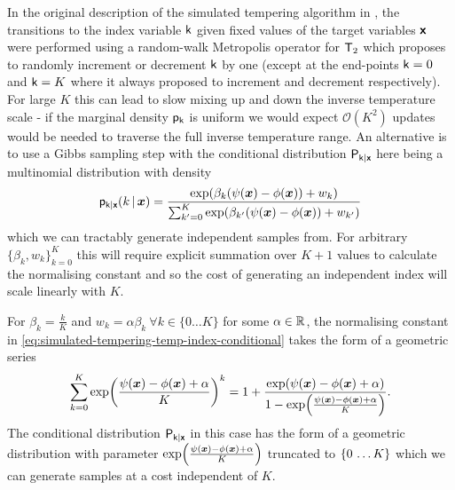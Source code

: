 In the original description of the simulated tempering algorithm in \citep{marinari1992simulated}, the transitions to the index variable $\mathsf{k}$ given fixed values of the target variables $\boldsymbol{\mathsf{x}}$ were performed using a random-walk Metropolis operator for $\mathsf{T}_2$ which proposes to randomly increment or decrement $\mathsf{k}$ by one (except at the end-points $\mathsf{k}=0$ and $\mathsf{k}=K$ where it always proposed to increment and decrement respectively). For large $K$ this can lead to slow mixing up and down the inverse temperature scale - if the marginal density $\mathsf{p}_{\mathsf{k}}$ is uniform we would expect $\mathcal{O}(K^2)$ updates would be needed to traverse the full inverse temperature range. An alternative is to use a Gibbs sampling step with the conditional distribution $\mathsf{P}_{\mathsf{k}|\boldsymbol{\mathsf{x}}}$ here being a multinomial distribution with density
\begin{equation}\label{eq:simulated-tempering-temp-index-conditional}
  \pden{\rvar{k}|\rvct{x}}(k \gvn \vct{x}) = 
  \frac{\exp\lpa \beta_k \lpa \psi(\vct{x}) - \phi(\vct{x}) \rpa + w_k \rpa}
  {\sum_{k'=0}^K \exp\lpa \beta_{k'} \lpa \psi(\vct{x}) - \phi(\vct{x}) \rpa + w_{k'} \rpa}
\end{equation}
which we can tractably generate independent samples from. For arbitrary $\lbrace \beta_k, w_k \rbrace_{k=0}^K$ this will require explicit summation over $K+1$ values to calculate the normalising constant and so the cost of generating an independent index will scale linearly with $K$. 

For $\beta_k = \frac{k}{K}$ and $w_k = \alpha \beta_k ~\forall k \in \lbrace 0\dots K\rbrace$ for some $\alpha \in \mathbb{R}$, the normalising constant in \eqref{eq:simulated-tempering-temp-index-conditional} takes the form of a geometric series
\begin{equation}
  \sum_{k=0}^K \exp\lpa \frac{\psi(\vct{x}) - \phi(\vct{x}) + \alpha}{K} \rpa^k = 
  1 + \frac{\exp\lpa \psi(\vct{x}) - \phi(\vct{x}) + \alpha \rpa}{1 - \exp\lpa \frac{\psi(\vct{x}) - \phi(\vct{x}) + \alpha}{K} \rpa}.
\end{equation}
The conditional distribution $\mathsf{P}_{\mathsf{k}|\boldsymbol{\mathsf{x}}}$ in this case has the form of a geometric distribution with parameter $\exp\lpa \frac{\psi(\vct{x}) - \phi(\vct{x}) + \alpha}{K} \rpa$ truncated to $\fset{0\,\dots K}$ which we can generate samples at a cost independent of $K$.

